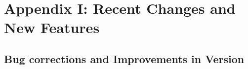 \documentclass[12pt,twoside]{article}
\newcommand{\linklatexhtml}[3]{%
\latexhtml{\htmladdnormallink{#1}{#2}}{\htmladdnormallink{#1}{#3}}}
\begin{document}
\vfill\newpage
\section{Appendix I: Recent Changes and New Features}
\label{sec:newfeatures}
\subsection{Bug corrections and Improvements in Version \hpxversion}%
\end{document}
